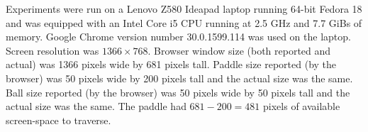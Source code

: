 





Experiments were run on a Lenovo Z580 Ideapad laptop running 64-bit Fedora 18 and was equipped with an Intel Core i5 CPU running at 2.5 GHz and 7.7 GiBs of memory. Google Chrome version number 30.0.1599.114 was used on the laptop. Screen resolution was $1366\times768$. Browser window size (both reported and actual) was 1366 pixels wide by 681 pixels tall. Paddle size reported (by the browser) was 50 pixels wide by 200 pixels tall and the actual size was the same. Ball size reported (by the browser) was 50 pixels wide by 50 pixels tall and the actual size was the same. The paddle had $681-200=481$ pixels of available screen-space to traverse.  

